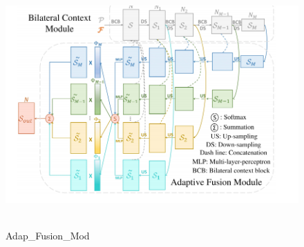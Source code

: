 \documentclass[a4paper,12pt]{article}
\begin{document}
	\begin{figure}[H]
	\begin{center}
		\includegraphics[width=1\textwidth]{img/Adap_Fusion_Mod.png} 
		\caption{Adap\_Fusion\_Mod}
	\end{center}
\end{figure}
\end{document}
